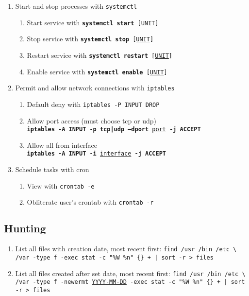 \documentclass[12pt,letterpaper]{article}
\def\code#1{\textcolor{c2}{\texttt{#1}}}
\def\bf#1{\textbf{#1}}
\def\ul#1{\underline{#1}}
\begin{document}
\begin{enumerate}
	\item Start and stop processes with \code{systemctl}
	\begin{enumerate}
		\item Start service with \code{\bf{systemctl start} [\ul{UNIT}]}
		\item Stop service with \code{\bf{systemctl stop} [\ul{UNIT}]}
		\item Restart service with \code{\bf{systemctl restart} [\ul{UNIT}]}
		\item Enable service with \code{\bf{systemctl enable} [\ul{UNIT}]}
	\end{enumerate}
	\item Permit and allow network connections with \code{iptables}
	\begin{enumerate}
		\item Default deny with \code{iptables -P INPUT DROP}
		\item Allow port access (must choose tcp or udp) \\
			\code{\bf{iptables -A INPUT -p tcp|udp --dport} \ul{port} \bf{-j ACCEPT}}
		\item Allow all from interface \\
			\code{\bf{iptables -A INPUT -i} \ul{interface} \bf{-j ACCEPT}}
	\end{enumerate}
	\item Schedule tasks with cron
	\begin{enumerate}
		\item View with \code{crontab -e}
		\item Obliterate user's crontab with \code{crontab -r}
	\end{enumerate}
\end{enumerate}

\subsection{Hunting}

\begin{enumerate}
	\item List all files with creation date, most recent first: \code{find /usr /bin /etc \textbackslash{} \\
		/var -type f -exec stat -c "\%W \%n" \{\} + | sort -r > files}
	\item List all files created after set date, most recent first: \code{find /usr /bin /etc \textbackslash{} \\
		/var -type f -newermt \ul{YYYY-MM-DD} -exec stat -c "\%W \%n" \{\} + | sort -r > files}
\end{enumerate}
\end{document}
